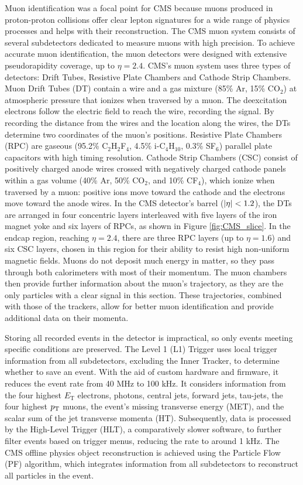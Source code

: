 Muon identification was a focal point for CMS because muons produced in proton-proton collisions offer clear lepton signatures for a wide range of physics processes and helps with their reconstruction. The CMS muon system consists of several subdetectors dedicated to measure muons with high precision. To achieve accurate muon identification, the muon detectors were designed with extensive pseudorapidity coverage, up to $\eta = 2.4$. CMS's muon system uses three types of detectors: Drift Tubes, Resistive Plate Chambers and Cathode Strip Chambers. Muon Drift Tubes (DT) contain a wire and a gas mixture (85\% Ar, 15\% CO$_2$) at atmospheric pressure that ionizes when traversed by a muon. The deexcitation electrons follow the electric field to reach the wire, recording the signal. By recording the distance from the wires and the location along the wires, the DTs determine two coordinates of the muon's positions. Resistive Plate Chambers (RPC) are gaseous (95.2\% C$_2$H$_2$F$_4$, 4.5\% i-C$_4$H$_{10}$, 0.3\% SF$_6$) parallel plate capacitors with high timing resolution. Cathode Strip Chambers (CSC) consist of positively charged anode wires crossed with negatively charged cathode panels within a gas volume (40\% Ar, 50\% CO$_2$, and 10\% CF$_4$), which ionize when traversed by a muon: positive ions move toward the cathode and the electrons move toward the anode wires. In the CMS detector's barrel ($\left\lvert\eta\right\rvert < 1.2$), the DTs are arranged in four concentric layers interleaved with five layers of the iron magnet yoke and six layers of RPCs, as shown in Figure \ref{fig:CMS_slice}. In the endcap region, reaching $\eta = 2.4$, there are three RPC layers (up to $\eta = 1.6$) and six CSC layers, chosen in this region for their ability to resist high non-uniform magnetic fields. Muons do not deposit much energy in matter, so they pass through both calorimeters with most of their momentum. The muon chambers then provide further information about the muon's trajectory, as they are the only particles with a clear signal in this section. These trajectories, combined with those of the trackers, allow for better muon identification and provide additional data on their momenta.

Storing all recorded events in the detector is impractical, so only events meeting specific conditions are preserved. The Level 1 (L1) Trigger uses local trigger information from all subdetectors, excluding the Inner Tracker, to determine whether to save an event. With the aid of custom hardware and firmware, it reduces the event rate from 40 MHz to 100 kHz. It considers information from the four highest $E_\text{T}$ electrons, photons, central jets, forward jets, tau-jets, the four highest $p_\text{T}$ muons, the event's missing transverse energy (MET), and the scalar sum of the jet transverse momenta (HT). Subsequently, data is processed by the High-Level Trigger (HLT), a comparatively slower software, to further filter events based on trigger menus, reducing the rate to around 1 kHz. The CMS offline physics object reconstruction is achieved using the Particle Flow (PF) algorithm, which integrates information from all subdetectors to reconstruct all particles in the event.

